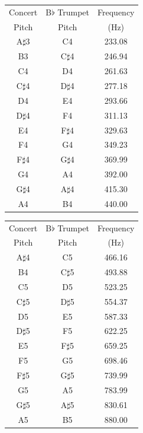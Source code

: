 \documentclass[10pt]{exam}
\begin{document}
  \begin{multicols}{3}
    \footnotesize
    \centering

    \begin{tabular}{ccc}
      Concert & B$\flat$ Trumpet & Frequency \\
      Pitch   &  Pitch & (Hz) \\
      \hline\hline
      A$\sharp$3 & C4 & 233.08 \\
      B3 & C$\sharp$4 & 246.94 \\
      C4 & D4 & 261.63 \\
      C$\sharp$4 & D$\sharp$4 & 277.18 \\
      D4 & E4 & 293.66 \\
      D$\sharp$4 & F4 & 311.13 \\
      E4 & F$\sharp$4 & 329.63 \\
      F4 & G4 & 349.23 \\
      F$\sharp$4 & G$\sharp$4 & 369.99 \\
      G4 & A4 & 392.00 \\
      G$\sharp$4 & A$\sharp$4 & 415.30 \\
      A4 & B4 & 440.00 \\
      \hline
    \end{tabular}

    \begin{tabular}{ccc}
      Concert & B$\flat$ Trumpet & Frequency \\
      Pitch   &  Pitch & (Hz) \\
      \hline\hline
      A$\sharp$4 & C5 & 466.16 \\
      B4 & C$\sharp$5 & 493.88 \\
      C5 & D5 & 523.25 \\
      C$\sharp$5 & D$\sharp$5 & 554.37 \\
      D5 & E5 & 587.33 \\
      D$\sharp$5 & F5 & 622.25 \\
      E5 & F$\sharp$5 & 659.25 \\
      F5 & G5 & 698.46 \\
      F$\sharp$5 & G$\sharp$5 & 739.99 \\
      G5 & A5 & 783.99 \\
      G$\sharp$5 & A$\sharp$5 & 830.61 \\
      A5 & B5 & 880.00 \\
      \hline
    \end{tabular}


\end{multicols}
\end{document}
